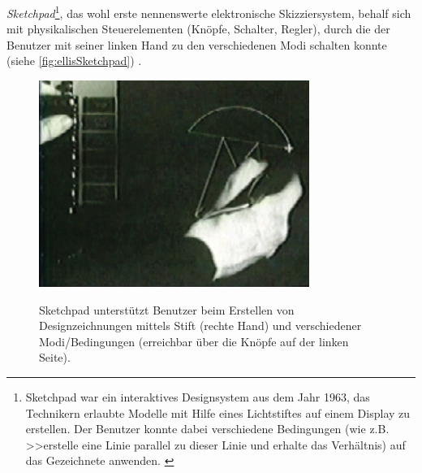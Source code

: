 \medskip \emph{Sketchpad}\footnote{Sketchpad war ein interaktives Designsystem aus dem Jahr 1963, das Technikern erlaubte Modelle mit Hilfe eines Lichtstiftes auf einem Display zu erstellen. Der Benutzer konnte dabei verschiedene Bedingungen (wie z.B. >>erstelle eine Linie parallel zu dieser Linie und erhalte das Verhältnis) auf das Gezeichnete anwenden. \citep{Sutherland:1964}}, das wohl erste nennenswerte elektronische Skizziersystem, behalf sich mit physikalischen Steuerelementen (Knöpfe, Schalter, Regler), durch die der Benutzer mit seiner linken Hand zu den verschiedenen Modi schalten konnte (siehe \autoref{fig:ellisSketchpad}) \citep{Sutherland:1964}. 

\begin{figure}[bth]
	{\includegraphics[width=\linewidth]{gfx/ellisSketchpad}}
	\caption[Sketchpad \newline \citep{Johnson:2009}]{Sketchpad unterstützt Benutzer beim Erstellen von Designzeichnungen mittels Stift (rechte Hand) und verschiedener Modi/Bedingungen (erreichbar über die Knöpfe auf der linken Seite).}
	\label{fig:ellisSketchpad}
\end{figure}

